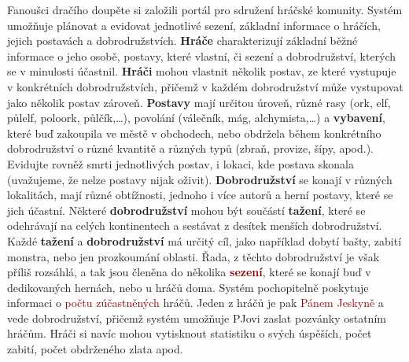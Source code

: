 \documentclass[a4paper, 11pt]{article}
\begin{document}
\begin{large}
	Fanoušci dračího doupěte si založili portál pro sdružení hráčské komunity. Systém umožňuje plánovat a evidovat jednotlivé sezení, základní informace o hráčích, jejich postavách a dobrodružstvích. \textcolor{coquelicot}{\textbf{Hráče}} charakterizují základní běžné informace o jeho \textcolor{coquelicot}{osobě}, \textcolor{coquelicot}{postavy}, které vlastní, či \textcolor{coquelicot}{sezení} a \textcolor{coquelicot}{dobrodružství}, kterých se v minulosti účastnil. \textcolor{coquelicot}{\textbf{Hráči}} mohou vlastnit několik \textcolor{coquelicot}{postav}, ze které vystupuje v konkrétních \textcolor{coquelicot}{dobrodružstvích}, přičemž v každém dobrodružství může vystupovat jako několik postav zároveň. \textcolor{blue-violet}{\textbf{Postavy}} mají určitou \textcolor{blue-violet}{úroveň}, různé \textcolor{blue-violet}{rasy} (ork, elf, půlelf, poloork, půlčík,…), \textcolor{blue-violet}{povolání} (válečník, mág, alchymista,…) a \textcolor{amber}{\textbf{vybavení}}, které buď zakoupila ve městě v obchodech, nebo obdržela během konkrétního dobrodružství o různé \textcolor{amber}{kvantitě} a různých \textcolor{amber}{typů} (zbraň, provize, šípy, apod.). Evidujte rovněž \textcolor{blue-violet}{smrti} jednotlivých postav, i \textcolor{blue-violet}{lokaci}, kde postava skonala (uvažujeme, že nelze postavy nijak oživit). \textcolor{mixgreen}{\textbf{Dobrodružství}} se konají v různých \textcolor{mixgreen}{lokalitách}, mají různé \textcolor{mixgreen}{obtížnosti}, jednoho i více \textcolor{mixgreen}{autorů} a herní \textcolor{mixgreen}{postavy}, které se jich účastní. Některé \textcolor{mixgreen}{\textbf{dobrodružství}} mohou být součástí \textcolor{blendedblue}{\textbf{tažení}}, které se odehrávají na celých \textcolor{blendedblue}{kontinentech} a sestávat z desítek menších \textcolor{blendedblue}{dobrodružství}. Každé \textcolor{blendedblue}{\textbf{tažení}} a \textcolor{mixgreen}{\textbf{dobrodružství}} má určitý \textcolor{blendedblue}{c}\textcolor{mixgreen}{íl}, jako například dobytí bašty, zabití monstra, nebo jen prozkoumání oblasti. Řada, z těchto dobrodružství je však příliš rozsáhlá, a tak jsou členěna do několika \textcolor{darkred}{\textbf{sezení}}, které se konají buď v dedikovaných hernách, nebo u hráčů doma. Systém pochopitelně poskytuje informaci o \textcolor{darkred}{počtu zúčastněných} hráčů. Jeden z hráčů je pak \textcolor{darkred}{Pánem Jeskyně} a vede dobrodružství, přičemž systém umožňuje PJovi zaslat pozvánky ostatním hráčům. Hráči si navíc mohou vytisknout statistiku o svých úspěších, počet zabití, počet obdrženého zlata apod.
\end{large}
\end{document}
